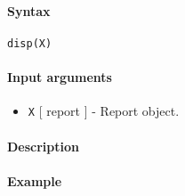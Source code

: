 


	\paragraph{Syntax}\label{syntax}

\begin{verbatim}
disp(X)
\end{verbatim}

\paragraph{Input arguments}\label{input-arguments}

\begin{itemize}
\itemsep1pt\parskip0pt
\item
  \texttt{X} {[} report {]} - Report object.
\end{itemize}

\paragraph{Description}\label{description}

\paragraph{Example}\label{example}


